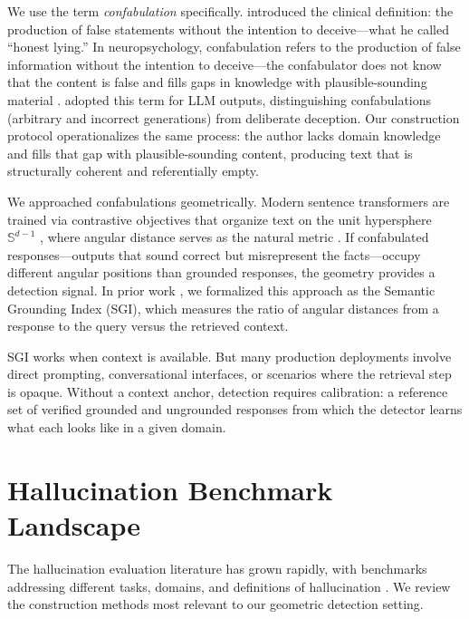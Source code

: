 \documentclass[11pt]{article}
\begin{document}
We use the term \emph{confabulation} specifically.
\citet{berlyne1972confabulation} introduced the clinical definition: the production of false statements without the intention to deceive---what he called ``honest lying.''
In neuropsychology, confabulation refers to the production of false information without the intention to deceive---the confabulator does not know that the content is false and fills gaps in knowledge with plausible-sounding material \citep{moscovitch1995confabulation, dallabarba1993different}.
\citet{farquhar2024detecting} adopted this term for LLM outputs, distinguishing confabulations (arbitrary and incorrect generations) from deliberate deception.
Our construction protocol operationalizes the same process: the author lacks domain knowledge and fills that gap with plausible-sounding content, producing text that is structurally coherent and referentially empty.

We approached confabulations geometrically. Modern sentence transformers are trained via contrastive objectives that organize text on the unit hypersphere $\mathbb{S}^{d-1}$ \citep{reimers2019sentence, wang2020understanding}, where angular distance serves as the natural metric \citep{mardia2000directional}.
If confabulated responses---outputs that sound correct but misrepresent the facts---occupy different angular positions than grounded responses, the geometry provides a detection signal.
In prior work \citep{marin2025sgi}, we formalized this approach as the Semantic Grounding Index (SGI), which measures the ratio of angular distances from a response to the query versus the retrieved context.

SGI works when context is available. But many production deployments involve direct prompting, conversational interfaces, or scenarios where the retrieval step is opaque.
Without a context anchor, detection requires calibration: a reference set of verified grounded and ungrounded responses from which the detector learns what each looks like in a given domain.

\section{Hallucination Benchmark Landscape}
\label{sec:existing}

The hallucination evaluation literature has grown rapidly, with benchmarks addressing different tasks, domains, and definitions of hallucination \citep{ji2023survey, huang2025survey}. We review the construction methods most relevant to our geometric detection setting.
\end{document}
